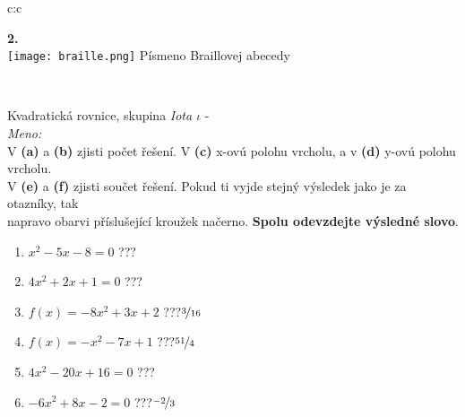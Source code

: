 \documentclass[10pt]{report}
\begin{document}
\begin{tabular}{c:c}
\begin{minipage}[c][99mm][t]{0.49\linewidth}
\begin{center}
\begin{minipage}{0.20\linewidth}
\begin{center}
{\Huge\bfseries 2.} \\[2mm]
\texttt{[image: braille.png]}
{\small Písmeno Braillovej abecedy}
\end{center}
\end{minipage}
\end{center}
\end{minipage}
\\ \hdashline
\begin{minipage}[c][99mm][t]{0.49\linewidth}
\begin{center}
\vspace{7mm}
{\huge Kvadratická rovnice, skupina \textit{Iota $\iota$} -}\\[4.5mm]
\textit{Meno:}\phantom{xxxxxxxxxxxxxxxxxxxxxxxxxxxxxxxxxxxxxxxxxxxxxxxxxxxxxxxxxxxxxxxxx}\\[3.5mm]
V \textbf{(a)} a \textbf{(b)} zjisti počet řešení. V \textbf{(c)} x-ovú polohu vrcholu, a v \textbf{(d)} y-ovú polohu vrcholu.\\V \textbf{(e)} a \textbf{(f)} zjisti součet řešení. Pokud ti vyjde stejný výsledek jako je za otazníky, tak\\napravo obarvi příslušející kroužek načerno. \textbf{Spolu odevzdejte výsledné slovo}.\\[3mm]
\begin{minipage}{0.77\linewidth}
\begin{center}
\begin{varwidth}{\textwidth}
\begin{enumerate}
\large
\item $x^2-5x-8=0$\quad \dotfill\; ???\;\dotfill {}
\item $4x^2+2x+1=0$\quad \dotfill\; ???\;\dotfill {}
\item $f(x)=-8x^2+3x+2$\quad \dotfill\; ???\;\dotfill \quad $\nicefrac{3}{16}$
\item $f(x)=-x^2-7x+1$\quad \dotfill\; ???\;\dotfill \quad $\nicefrac{51}{4}$
\item $4x^2-20x+16=0$\quad \dotfill\; ???\;\dotfill {}
\item $-6x^2+8x-2=0$\quad \dotfill\; ???\;\dotfill \quad $\nicefrac{-2}{3}$
\end{enumerate}
\end{varwidth}
\end{center}
\end{minipage}
\begin{minipage}{0.20\linewidth}
\begin{center}

\end{center}
\end{minipage}
\end{center}
\end{minipage}
\end{tabular}
\end{document}

